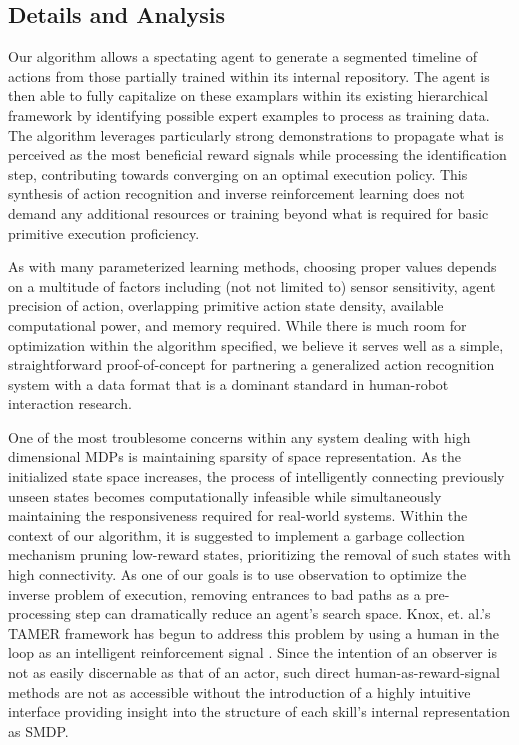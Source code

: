 \documentclass[letterpaper]{article}
\begin{document}
\subsection{Details and Analysis}
\label{sec:recognition_analysis}
Our algorithm allows a spectating agent to generate a segmented timeline of actions from those partially trained within its internal repository. The agent is then able to fully capitalize on these examplars within its existing hierarchical framework by identifying possible expert examples to process as training data. The algorithm leverages particularly strong demonstrations to propagate what is perceived as the most beneficial reward signals while processing the identification step, contributing towards converging on an optimal execution policy. This synthesis of action recognition and inverse reinforcement learning does not demand any additional resources or training beyond what is required for basic primitive execution proficiency.

As with many parameterized learning methods, choosing proper values depends on a multitude of factors including (not not limited to) sensor sensitivity, agent precision of action, overlapping primitive action state density, available computational power, and memory required. While there is much room for optimization within the algorithm specified, we believe it serves well as a simple, straightforward proof-of-concept for partnering a generalized action recognition system with a data format that is a dominant standard in human-robot interaction research.

One of the most troublesome concerns within any system dealing with high dimensional MDPs is maintaining sparsity of space representation. As the initialized state space increases, the process of intelligently connecting previously unseen states becomes computationally infeasible while simultaneously maintaining the responsiveness required for real-world systems. Within the context of our algorithm, it is suggested to implement a garbage collection mechanism pruning low-reward states, prioritizing the removal of such states with high connectivity. As one of our goals is to use observation to optimize the inverse problem of execution, removing entrances to bad paths as a pre-processing step can dramatically reduce an agent's search space. Knox, et. al.'s TAMER framework has begun to address this problem by using a human in the loop as an intelligent reinforcement signal \cite{TAMER}. Since the intention of an observer is not as easily discernable as that of an actor, such direct human-as-reward-signal methods are not as accessible without the introduction of a highly intuitive interface providing insight into the structure of each skill's internal representation as SMDP.
\end{document}
